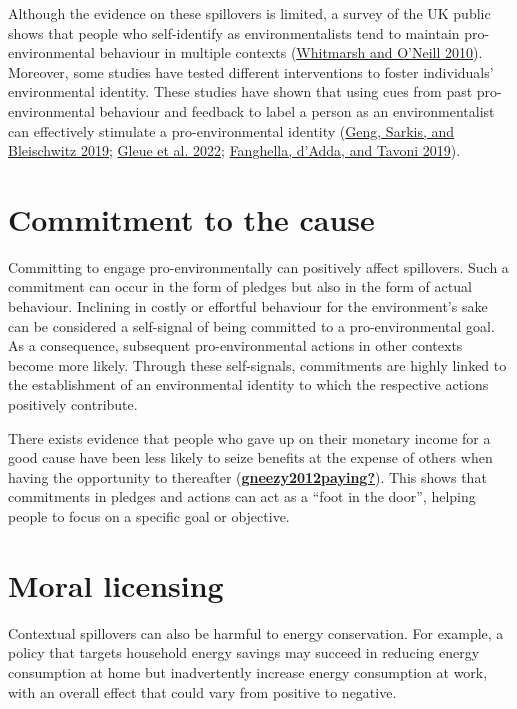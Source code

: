 \documentclass[
  12pt,
  captions=heading]{scrreport}
\begin{document}
Although the evidence on these spillovers is limited, a survey of the UK
public shows that people who self-identify as environmentalists tend to
maintain pro-environmental behaviour in multiple contexts
(\protect\hyperlink{ref-whitmarsh2010green}{Whitmarsh and O'Neill
2010}). Moreover, some studies have tested different interventions to
foster individuals' environmental identity. These studies have shown
that using cues from past pro-environmental behaviour and feedback to
label a person as an environmentalist can effectively stimulate a
pro-environmental identity
(\protect\hyperlink{ref-geng2019globalize}{Geng, Sarkis, and Bleischwitz
2019}; \protect\hyperlink{ref-gleue2022identity}{Gleue et al. 2022};
\protect\hyperlink{ref-fanghella2019use}{Fanghella, d'Adda, and Tavoni
2019}).

\hypertarget{commitment-to-the-cause}{%
\section{Commitment to the cause}\label{commitment-to-the-cause}}

Committing to engage pro-environmentally can positively affect
spillovers. Such a commitment can occur in the form of pledges but also
in the form of actual behaviour. Inclining in costly or effortful
behaviour for the environment's sake can be considered a self-signal of
being committed to a pro-environmental goal. As a consequence,
subsequent pro-environmental actions in other contexts become more
likely. Through these self-signals, commitments are highly linked to the
establishment of an environmental identity to which the respective
actions positively contribute.

There exists evidence that people who gave up on their monetary income
for a good cause have been less likely to seize benefits at the expense
of others when having the opportunity to thereafter
(\protect\hyperlink{ref-gneezy2012paying}{\textbf{gneezy2012paying?}}).
This shows that commitments in pledges and actions can act as a ``foot
in the door'', helping people to focus on a specific goal or objective.

\hypertarget{moral-licensing}{%
\section{Moral licensing}\label{moral-licensing}}

Contextual spillovers can also be harmful to energy conservation. For
example, a policy that targets household energy savings may succeed in
reducing energy consumption at home but inadvertently increase energy
consumption at work, with an overall effect that could vary from
positive to negative.
\end{document}
